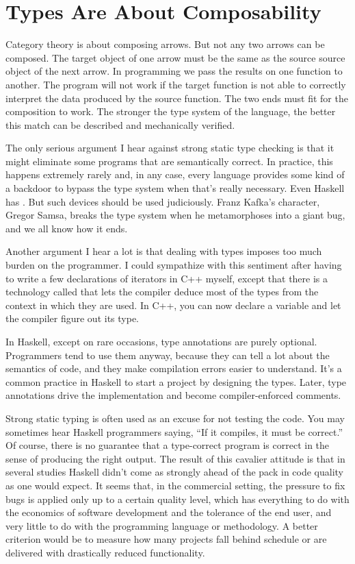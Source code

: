\section{Types Are About
Composability}\label{types-are-about-composability}

Category theory is about composing arrows. But not any two arrows can be
composed. The target object of one arrow must be the same as the source
source object of the next arrow. In programming we pass the results on
one function to another. The program will not work if the target
function is not able to correctly interpret the data produced by the
source function. The two ends must fit for the composition to work. The
stronger the type system of the language, the better this match can be
described and mechanically verified.

The only serious argument I hear against strong static type checking is
that it might eliminate some programs that are semantically correct. In
practice, this happens extremely rarely and, in any case, every language
provides some kind of a backdoor to bypass the type system when that's
really necessary. Even Haskell has . But such
devices should be used judiciously. Franz Kafka's character, Gregor
Samsa, breaks the type system when he metamorphoses into a giant bug,
and we all know how it ends.

Another argument I hear a lot is that dealing with types imposes too
much burden on the programmer. I could sympathize with this sentiment
after having to write a few declarations of iterators in C++ myself,
except that there is a technology called  that lets
the compiler deduce most of the types from the context in which they are
used. In C++, you can now declare a variable  and let the
compiler figure out its type.

In Haskell, except on rare occasions, type annotations are purely
optional. Programmers tend to use them anyway, because they can tell a
lot about the semantics of code, and they make compilation errors easier
to understand. It's a common practice in Haskell to start a project by
designing the types. Later, type annotations drive the implementation
and become compiler-enforced comments.

Strong static typing is often used as an excuse for not testing the
code. You may sometimes hear Haskell programmers saying, ``If it
compiles, it must be correct.'' Of course, there is no guarantee that a
type-correct program is correct in the sense of producing the right
output. The result of this cavalier attitude is that in several studies
Haskell didn't come as strongly ahead of the pack in code quality as one
would expect. It seems that, in the commercial setting, the pressure to
fix bugs is applied only up to a certain quality level, which has
everything to do with the economics of software development and the
tolerance of the end user, and very little to do with the programming
language or methodology. A better criterion would be to measure how many
projects fall behind schedule or are delivered with drastically reduced
functionality.

